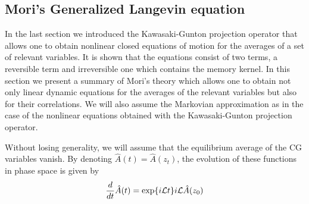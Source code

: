 \documentclass[b5paper,openright,10pt]{book}
\begin{document}
\subsection{Mori's Generalized Langevin equation}
\label{Sec:Mori}
In the last section we introduced the Kawasaki-Gunton projection operator that allows one to obtain nonlinear closed equations of motion for the averages of a set of relevant variables. It is shown that the equations consist of two terms, a reversible term and irreversible one which contains the memory kernel. 
In this section we present a summary of Mori's theory \cite{Mori1965} which allows one to obtain not only linear dynamic equations for the averages of the relevant variables but also for their correlations. We will also assume the Markovian approximation as in the case of the nonlinear equations obtained with the Kawasaki-Gunton projection operator. 

Without  losing  generality,  we  will assume  that  the  equilibrium
average   of    the   CG    variables   vanish.    By    denoting  
$\hat{A}(t)=\hat{A}(z_t)$, the  evolution of these functions  in phase
space is given by
\begin{eqnarray}
\frac{d}{dt}{\hat{A}}(t)=\exp\{i{\cal L}t\}i{\cal L}\hat{A}(z_0)
\label{LA}
\end{eqnarray}

\end{document}
